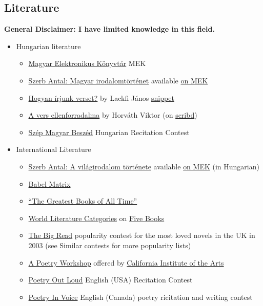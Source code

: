 \documentclass{article}
\begin{document}
\subsection{Literature}
\textbf{General Disclaimer: I have limited knowledge in this field.}



\begin{itemize}
    \item Hungarian literature
    \begin{itemize}
        \item \href{https://mek.oszk.hu/}{Magyar Elektronikus Könyvtár} MEK
        \item \href{https://moly.hu/konyvek/szerb-antal-magyar-irodalomtortenet}{Szerb Antal: Magyar irodalomtörténet} available \href{https://mek.oszk.hu/14800/14871/}{on MEK}
        \item \href{https://moly.hu/konyvek/lackfi-janos-hogyan-irjunk-verset}{Hogyan írjunk verset?} by Lackfi János \href{https://olvassbele.com/2021/02/05/lackfi-janos-hogyan-irjunk-verset-reszlet/}{snippet}
        \item \href{https://moly.hu/konyvek/horvath-viktor-a-vers-ellenforradalma}{A vers ellenforradalma} by Horváth Viktor (on \href{https://www.scribd.com/book/342092705/A-vers-ellenforradalma-A-versiras-es-versforditas-tanulasa-es-tanitasa}{scribd})
        \item \href{https://szepmagyarbeszed.hu/}{Szép Magyar Beszéd} Hungarian Recitation Contest
    \end{itemize}
    \item International Literature
    \begin{itemize}
        \item \href{https://moly.hu/konyvek/szerb-antal-a-vilagirodalom-tortenete}{Szerb Antal: A világirodalom története} available \href{https://mek.oszk.hu/14800/14872/}{on MEK} (in Hungarian)
        \item \href{https://www.babelmatrix.org/}{Babel Matrix}
        \item \href{https://thegreatestbooks.org/}{``The Greatest Books of All Time''}
        \item \href{https://fivebooks.com/category/fiction/world-literature-books/}{World Literature Categories} on \href{https://fivebooks.com/}{Five Books}
        \item \href{https://en.wikipedia.org/wiki/The_Big_Read}{The Big Read} popularity contest for the most loved novels in the UK in 2003 (see Similar contests for more popularity lists) 
        \item \href{https://www.coursera.org/learn/poetry-workshop}{A Poetry Workshop} offered by \href{https://calarts.edu/}{California Institute of the Arts}
        \item \href{https://www.poetryoutloud.org/}{Poetry Out Loud} English (USA) Recitation Contest
        \item \href{https://www.poetryinvoice.com/}{Poetry In Voice} English (Canada) poetry ricitation and writing contest
    \end{itemize}
\end{itemize}
\end{document}
